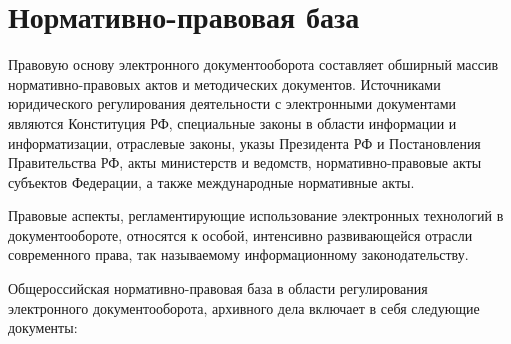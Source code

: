 \section{Нормативно-правовая база}

Правовую основу электронного документооборота составляет обширный массив нормативно-правовых актов и методических документов. Источниками юридического регулирования деятельности с электронными документами являются Конституция РФ, специальные законы в области информации и информатизации, отраслевые законы, указы Президента РФ и Постановления Правительства РФ, акты министерств и ведомств, нормативно-правовые акты субъектов Федерации, а также международные нормативные акты.

Правовые аспекты, регламентирующие использование электронных технологий в документообороте, относятся к особой, интенсивно развивающейся отрасли современного права, так называемому информационному законодательству.

Общероссийская нормативно-правовая база в области регулирования электронного документооборота, архивного дела включает в себя следующие документы:

